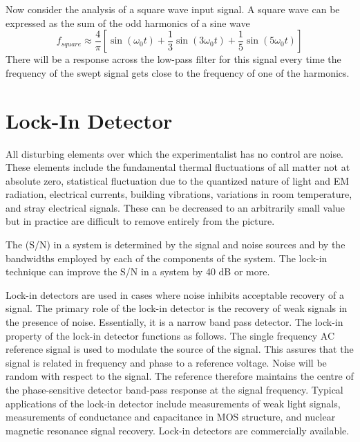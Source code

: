 \documentclass[12pt, a4paper, oneside, openright, titlepage]{book}
\begin{document}
Now consider the analysis of a square wave input signal. A square wave can be expressed as the sum of the odd harmonics of a sine wave \begin{equation*}
    f_{square} \approx \frac{4}{\pi}\left[\sin(\omega_0t) + \frac{1}{3}\sin(3\omega_0t) + \frac{1}{5}\sin(5\omega_0t)\right]
\end{equation*}
There will be a response across the low-pass filter for this signal every time the frequency of the swept signal gets close to the frequency of one of the harmonics.





\chapter{Lock-In Detector}

\begin{defn}[Noise]
    All disturbing elements over which the experimentalist has no control are noise. These elements include the fundamental thermal fluctuations of all matter not at absolute zero, statistical fluctuation due to the quantized nature of light and EM radiation, electrical currents, building vibrations, variations in room temperature, and stray electrical signals. These can be decreased to an arbitrarily small value but in practice are difficult to remove entirely from the picture.
\end{defn}

\begin{defn}
    The  (S/N) in a system is determined by the signal and noise sources and by the bandwidths employed by each of the components of the system. The lock-in technique can improve the S/N in a system by 40 dB or more.
\end{defn}

Lock-in detectors are used in cases where noise inhibits acceptable recovery of a signal. The primary role of the lock-in detector is the recovery of weak signals in the presence of noise. Essentially, it is a narrow band pass detector. The lock-in property of the lock-in detector functions as follows. The single frequency AC reference signal is used to modulate the source of the signal. This assures that the signal is related in frequency and phase to a reference voltage. Noise will be random with respect to the signal. The reference therefore maintains the centre of the phase-sensitive detector band-pass response at the signal frequency. Typical applications of the lock-in detector include measurements of weak light signals, measurements of conductance and capacitance in MOS structure, and nuclear magnetic resonance signal recovery. Lock-in detectors are commercially available. 
\end{document}
